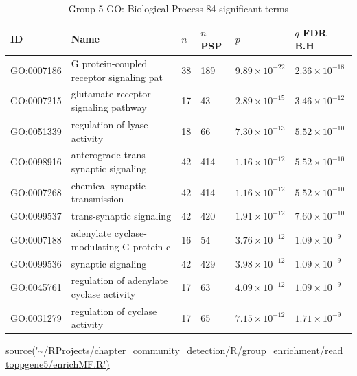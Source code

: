 \begin{table}[ht]
\centering
\setlength{\extrarowheight}{2pt}
\begin{adjustbox}{width=\textwidth}
\begin{tabular}{llllll}
  \toprule
ID & Name &$n$ &$n$ PSP& $p$ & $q$ FDR B.H \\ 
  \midrule
GO:0007186 & G protein-coupled receptor signaling pat & 38 & 189 & $9.89 \times 10^{-22}$ & $2.36 \times 10^{-18}$ \\ 
  GO:0007215 & glutamate receptor signaling pathway & 17 & 43 & $2.89 \times 10^{-15}$ & $3.46 \times 10^{-12}$ \\ 
  GO:0051339 & regulation of lyase activity & 18 & 66 & $7.30 \times 10^{-13}$ & $5.52 \times 10^{-10}$ \\ 
  GO:0098916 & anterograde trans-synaptic signaling & 42 & 414 & $1.16 \times 10^{-12}$ & $5.52 \times 10^{-10}$ \\ 
  GO:0007268 & chemical synaptic transmission & 42 & 414 & $1.16 \times 10^{-12}$ & $5.52 \times 10^{-10}$ \\ 
  GO:0099537 & trans-synaptic signaling & 42 & 420 & $1.91 \times 10^{-12}$ & $7.60 \times 10^{-10}$ \\ 
  GO:0007188 & adenylate cyclase-modulating G protein-c & 16 & 54 & $3.76 \times 10^{-12}$ & $1.09 \times 10^{-9}$ \\ 
  GO:0099536 & synaptic signaling & 42 & 429 & $3.98 \times 10^{-12}$ & $1.09 \times 10^{-9}$ \\ 
  GO:0045761 & regulation of adenylate cyclase activity & 17 & 63 & $4.09 \times 10^{-12}$ & $1.09 \times 10^{-9}$ \\ 
  GO:0031279 & regulation of cyclase activity & 17 & 65 & $7.15 \times 10^{-12}$ & $1.71 \times 10^{-9}$ \\ 
   \bottomrule
\end{tabular}
\end{adjustbox}
\caption{Group 5 GO: Biological Process 84 significant terms} 
\tiny\url{source('~/RProjects/chapter_community_detection/R/group_enrichment/read_toppgene5/enrichMF.R')}
\label{tab:Group 5 GO: Biological Process 84 significant terms}
\end{table}




